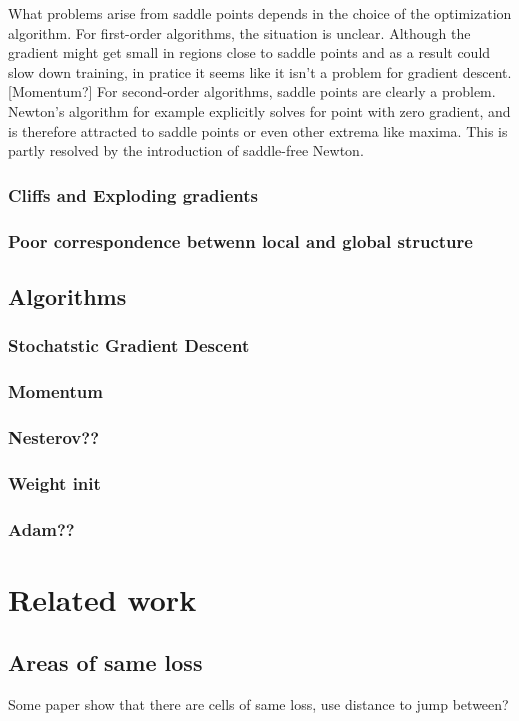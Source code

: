 What problems arise from saddle points depends in the choice of the optimization
algorithm. For first-order algorithms, the situation is unclear. Although the
gradient might get small in regions close to saddle points and as a result could
slow down training, in pratice it seems like it isn't a problem for gradient
descent. [Momentum?]
For second-order algorithms, saddle points are clearly a problem. Newton's
algorithm for example explicitly solves for point with zero gradient, and is
therefore attracted to saddle points or even other extrema like maxima. This is
partly resolved by the introduction of saddle-free Newton. 


\subsubsection{Cliffs and Exploding gradients}

\subsubsection{Poor correspondence betwenn local and global structure}

\subsection{Algorithms}
\subsubsection{Stochatstic Gradient Descent}
\subsubsection{Momentum}
\subsubsection{Nesterov??}
\subsubsection{Weight init}
\subsubsection{Adam??}


\section{Related work}
\subsection{Areas of same loss}
Some paper show that there are cells of same loss, use distance to jump between?
